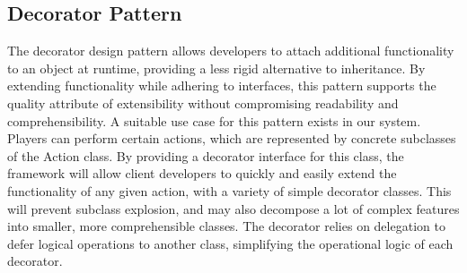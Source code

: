 \documentclass[11pt]{report}
\begin{document}
	\subsection{Decorator Pattern}
	The decorator design pattern allows developers to attach additional functionality to an object at runtime, providing a less rigid alternative to inheritance. By extending functionality while adhering to interfaces, this pattern supports the quality attribute of extensibility without compromising readability and comprehensibility. A suitable use case for this pattern exists in our system. Players can perform certain actions, which are represented by concrete subclasses of the Action class. By providing a decorator interface for this class, the framework will allow client developers to quickly and easily extend the functionality of any given action, with a variety of simple decorator classes. This will prevent subclass explosion, and may also decompose a lot of complex features into smaller, more comprehensible classes. The decorator relies on delegation to defer logical operations to another class, simplifying the operational logic of each decorator. 
\end{document}
